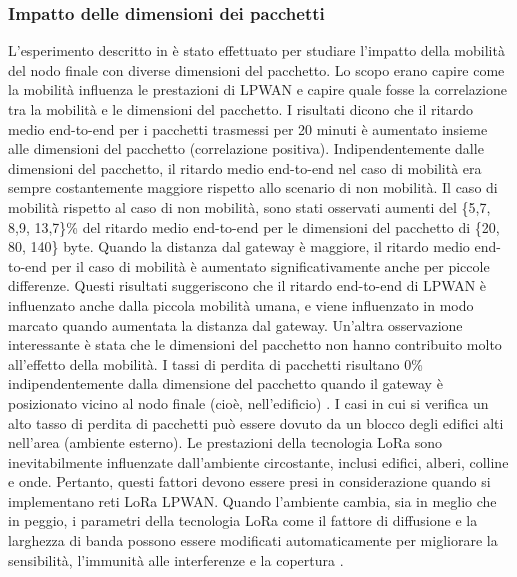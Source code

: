 \documentclass[a4paper]{report} %
\begin{document}
\subsubsection{Impatto delle dimensioni dei pacchetti} 
L'esperimento descritto in \cite{art:rif.47} è stato effettuato per studiare l'impatto della mobilità del nodo finale con diverse dimensioni del pacchetto. Lo scopo erano capire come la mobilità influenza le prestazioni di LPWAN e capire quale fosse la correlazione tra la mobilità e le dimensioni del pacchetto. I risultati dicono che il ritardo medio end-to-end per i pacchetti trasmessi per 20 minuti è aumentato insieme alle dimensioni del pacchetto (correlazione positiva). Indipendentemente dalle dimensioni del pacchetto, il ritardo medio end-to-end nel caso di mobilità era sempre costantemente maggiore rispetto allo scenario di non mobilità. Il caso di mobilità rispetto al caso di non mobilità, sono stati osservati aumenti del \{5,7, 8,9, 13,7\}\% del ritardo medio end-to-end per le dimensioni del pacchetto di \{20, 80, 140\} byte. Quando la distanza dal gateway è maggiore, il ritardo medio end-to-end per il caso di mobilità è aumentato significativamente anche per piccole differenze. Questi risultati suggeriscono che il ritardo end-to-end di LPWAN è influenzato anche dalla piccola mobilità umana, e viene influenzato in modo marcato quando aumentata la distanza dal gateway. Un'altra osservazione interessante è stata che le dimensioni del pacchetto non hanno contribuito molto all'effetto della mobilità. I tassi di perdita di pacchetti risultano 0\% indipendentemente dalla dimensione del pacchetto quando il gateway è posizionato vicino al nodo finale (cioè, nell'edificio) \cite{art:rif.47}.
I casi in cui si verifica un alto tasso di perdita di pacchetti può essere dovuto da un blocco degli edifici alti nell'area (ambiente esterno). Le prestazioni della tecnologia LoRa sono inevitabilmente influenzate dall'ambiente circostante, inclusi edifici, alberi, colline e onde. Pertanto, questi fattori devono essere presi in considerazione quando si implementano reti LoRa LPWAN. Quando l'ambiente cambia, sia in meglio che in peggio, i parametri della tecnologia LoRa come il fattore di diffusione e la larghezza di banda possono essere modificati automaticamente per migliorare la sensibilità, l'immunità alle interferenze e la copertura \cite{art:rif.44}.
\end{document}
